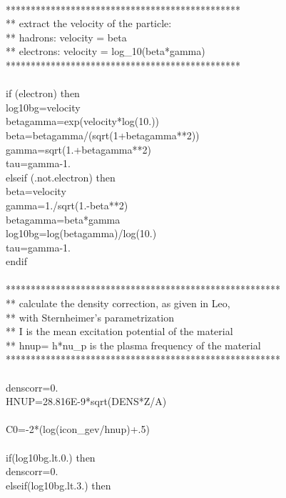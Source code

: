 { \\
***********************************************\\
** extract the velocity of the particle:\\
**     hadrons:   velocity = beta\\
**     electrons: velocity = log\_10(beta*gamma)\\
***********************************************\\
 \\
      if (electron) then\\
         log10bg=velocity\\
         betagamma=exp(velocity*log(10.))\\
         beta=betagamma/(sqrt(1+betagamma**2))\\
         gamma=sqrt(1.+betagamma**2)\\
         tau=gamma-1.\\
      elseif (.not.electron) then\\
         beta=velocity\\
         gamma=1./sqrt(1.-beta**2)\\
         betagamma=beta*gamma\\
         log10bg=log(betagamma)/log(10.)\\
         tau=gamma-1.\\
      endif\\
 \\
*******************************************************\\
** calculate the density correction, as given in Leo,\\
** with Sternheimer's parametrization\\
** I is the mean excitation potential of the material\\
** hnup= h*nu\_p is the plasma frequency of the material\\
*******************************************************\\
 \\
      denscorr=0.\\
      HNUP=28.816E-9*sqrt(DENS*Z/A)\\
 \\
      C0=-2*(log(icon\_gev/hnup)+.5)\\
 \\
      if(log10bg.lt.0.) then\\
         denscorr=0.\\
      elseif(log10bg.lt.3.) then\\
}
